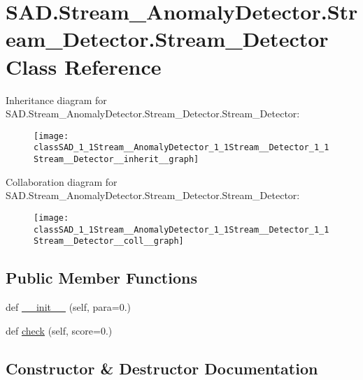 \hypertarget{classSAD_1_1Stream__AnomalyDetector_1_1Stream__Detector_1_1Stream__Detector}{}\section{S\+A\+D.\+Stream\+\_\+\+Anomaly\+Detector.\+Stream\+\_\+\+Detector.\+Stream\+\_\+\+Detector Class Reference}
\label{classSAD_1_1Stream__AnomalyDetector_1_1Stream__Detector_1_1Stream__Detector}


Inheritance diagram for S\+A\+D.\+Stream\+\_\+\+Anomaly\+Detector.\+Stream\+\_\+\+Detector.\+Stream\+\_\+\+Detector\+:\nopagebreak
\begin{figure}[H]
\begin{center}
\leavevmode
\texttt{[image: classSAD\_1\_1Stream\_\_AnomalyDetector\_1\_1Stream\_\_Detector\_1\_1Stream\_\_Detector\_\_inherit\_\_graph]}
\end{center}
\end{figure}


Collaboration diagram for S\+A\+D.\+Stream\+\_\+\+Anomaly\+Detector.\+Stream\+\_\+\+Detector.\+Stream\+\_\+\+Detector\+:\nopagebreak
\begin{figure}[H]
\begin{center}
\leavevmode
\texttt{[image: classSAD\_1\_1Stream\_\_AnomalyDetector\_1\_1Stream\_\_Detector\_1\_1Stream\_\_Detector\_\_coll\_\_graph]}
\end{center}
\end{figure}
\subsection*{Public Member Functions}
\begin{DoxyCompactItemize}
\item 
def \hyperlink{classSAD_1_1Stream__AnomalyDetector_1_1Stream__Detector_1_1Stream__Detector_ab0755de610c22dfb6b2bbdfce4ec5d67}{\+\_\+\+\_\+init\+\_\+\+\_\+} (self, para=0.)
\item 
def \hyperlink{classSAD_1_1Stream__AnomalyDetector_1_1Stream__Detector_1_1Stream__Detector_ab1cad60e8f3996d3cf8aae56111f356b}{check} (self, score=0.)
\end{DoxyCompactItemize}


\subsection{Constructor \& Destructor Documentation}
